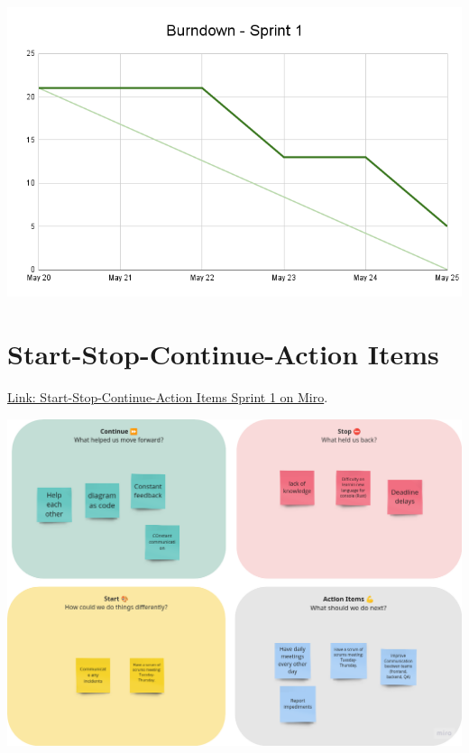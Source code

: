 \includegraphics[width=\textwidth]{./artifacts/src/sprint-1/assets/Burndown-Sprint1.png}

\hypertarget{startstopcontinueactionitems-s1}{
\section{Start-Stop-Continue-Action Items}\label{Start-Stop-Continue-Action Items S1}}
\href{https://miro.com/app/board/uXjVKDO7l8M=/?moveToWidget=3458764590247693119&cot=14}{Link: Start-Stop-Continue-Action Items Sprint 1 on Miro}.

\includegraphics[width=\textwidth]{./artifacts/src/sprint-1/assets/retrospective-s1.png}


